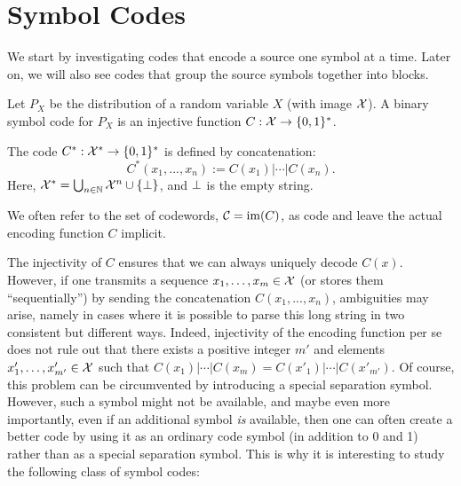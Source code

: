 



\section{Symbol Codes}
We start by investigating codes that encode a source one symbol at a time. Later on, we will also see codes that group the source symbols together into blocks.
\begin{definition}
Let $P_X$ be the distribution of a random variable $X$ (with image ${\cal X}$). A binary symbol code for $P_X$ is an injective function $C : {\cal X} \to \{0,1\}^*$.

The  code $C^* : {\cal X}^* \to \{0,1\}^*$ is defined by concatenation:
\[
C^*(x_1, ..., x_n) := C(x_1) | \cdots |C(x_n).
\]
Here, ${\cal X}^* = \bigcup_{n \in \mathbb{N}} {\cal X}^n \cup \{\bot\}$, and $\bot$ is the empty string.
\end{definition}
We often refer to the set of codewords, ${\cal C} = \mathrm{im}(C)$, as code and leave the actual encoding function $C$ implicit. 

The injectivity of $C$ ensures that we can always uniquely decode $C(x)$. However, if one transmits a sequence $x_1, \ldots, x_m\in {\cal X}$
(or stores them ``sequentially'') by sending the concatenation $C(x_1, ..., x_n)$, ambiguities may arise, namely in cases where it is possible to parse this long
string in two consistent but different ways. Indeed, injectivity of
the encoding function per se does not rule out that there exists a
positive integer $m'$ and elements $x'_1, \ldots, x'_{m'}\in {\cal X}$
such that $C(x_1)| \cdots | C(x_m)=C(x'_1)| \cdots | C(x'_{m'})$. Of course, this problem can be circumvented by introducing a special separation symbol. However, such a symbol might not be available, and maybe even more importantly, even if an additional symbol {\em is} available, then one can often create a better code by using it as an ordinary code symbol (in addition to 0 and 1) rather than as a special separation symbol. This is why it is interesting to study the following class of symbol codes:

